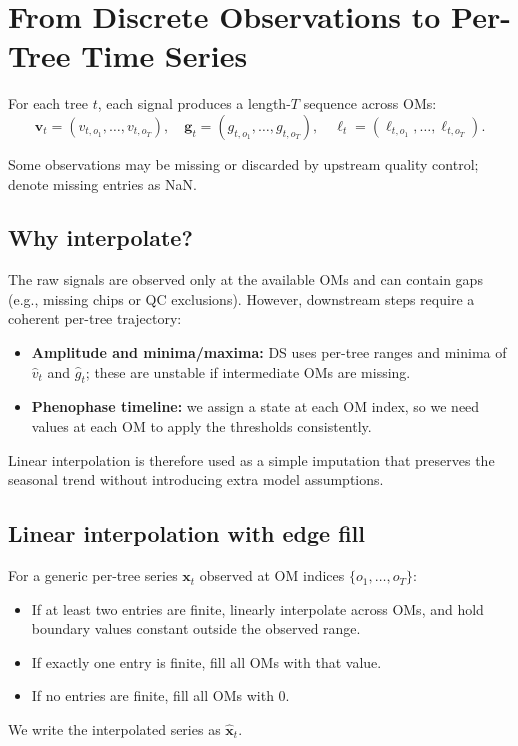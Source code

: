 \documentclass{article}
\begin{document}
\section{From Discrete Observations to Per-Tree Time Series}
\label{sec:interpolation}

For each tree $t$, each signal produces a length-$T$ sequence across OMs:
\begin{equation}
\mathbf{v}_t = (v_{t,o_1},\dots,v_{t,o_T}),\quad
\mathbf{g}_t = (g_{t,o_1},\dots,g_{t,o_T}),
\quad
\mathbf{\ell}_t = (\ell_{t,o_1},\dots,\ell_{t,o_T}).
\end{equation}

Some observations may be missing or discarded by upstream quality control; denote missing entries as NaN.

\subsection{Why interpolate?}

The raw signals are observed only at the available OMs and can contain gaps (e.g., missing chips or QC exclusions). However, downstream steps require a coherent per-tree trajectory:
\begin{itemize}[leftmargin=*, itemsep=2pt]
  \item \textbf{Amplitude and minima/maxima:} DS uses per-tree ranges and minima of $\hat{v}_t$ and $\hat{g}_t$; these are unstable if intermediate OMs are missing.
  \item \textbf{Phenophase timeline:} we assign a state at each OM index, so we need values at each OM to apply the thresholds consistently.
\end{itemize}
Linear interpolation is therefore used as a simple imputation that preserves the seasonal trend without introducing extra model assumptions.

\subsection{Linear interpolation with edge fill}

For a generic per-tree series $\mathbf{x}_t$ observed at OM indices $\{o_1,\dots,o_T\}$:
\begin{itemize}[leftmargin=*, itemsep=2pt]
  \item If at least two entries are finite, linearly interpolate across OMs, and hold boundary values constant outside the observed range.
  \item If exactly one entry is finite, fill all OMs with that value.
  \item If no entries are finite, fill all OMs with 0.
\end{itemize}
We write the interpolated series as $\hat{\mathbf{x}}_t$.
\end{document}
